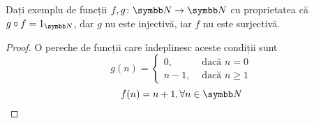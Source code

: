 \begin{exercise}
Dați exemplu de funcții \(\function{f, g}{\naturals}{\naturals}\) cu proprietatea că \(g \circ f = 1_{\naturals}\), dar \(g\) nu este injectivă, iar \(f\) nu este surjectivă.
\end{exercise}
\begin{proof}
O pereche de funcții care îndeplinesc aceste condiții sunt
\[
g(n) = \begin{cases}
0, &\text{ dacă } n = 0 \\
n - 1, &\text{ dacă } n \geq 1
\end{cases}
\]
\[
f(n) = n + 1, \forall n \in \naturals
\]
\end{proof}